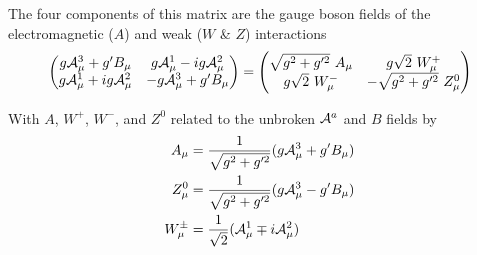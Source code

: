        The four components of this matrix are the gauge boson fields of the electromagnetic ($A$) and weak ($W$ \& $Z$) interactions
        \begin{equation} \begin{split}
            \label{eq:electroweak_matrix}
            \begin{pmatrix} 
                g\wField^3_{\mu} + g'B_{\mu} & g\wField^1_{\mu} - ig\wField^2_{\mu} \\
                g\wField^1_{\mu} + ig\wField^2_{\mu} & -g\wField^3_{\mu} + g'B_{\mu}
            \end{pmatrix} =
            \begin{pmatrix} 
                \sqrt{g^2 + g^{\prime 2}}\ A_{\mu} & g \sqrt{2}\ W^+_{\mu} \\
                g \sqrt{2}\ W^-_{\mu} & - \sqrt{g^2 + g^{\prime 2}}\ Z^0_{\mu}
            \end{pmatrix}
        \end{split} \end{equation}

        With $A$, $W^+$, $W^-$, and $Z^0$ related to the unbroken $\mathcal{A}^a$ and $B$ fields by
        \begin{equation} \begin{split}
            A_{\mu} & = \frac{1}{\sqrt{g^2 + g^{\prime 2}}} ( g\mathcal{A}^3_{\mu} + g'B_{\mu} ) \\
            Z^0_{\mu} & = \frac{1}{\sqrt{g^2 + g^{\prime 2}}} ( g\mathcal{A}^3_{\mu} - g'B_{\mu} ) \\
            W^{\pm}_{\mu} & = \frac{1}{\sqrt{2}} (\mathcal{A}^1_{\mu} \mp i\mathcal{A}^2_{\mu})
        \end{split} \end{equation}

